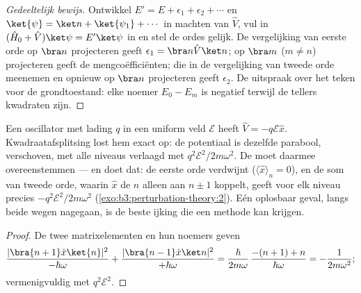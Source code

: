 \begin{proof}[Gedeeltelijk bewijs]
Ontwikkel $E' = E + \epsilon_1 + \epsilon_2 + \cdots$ en $\ket{\psi} =
\ket n + \ket{\psi_1} + \cdots$ in machten van $\hat V$, vul in
$(\hat H_0 + \hat V)\ket\psi = E'\ket\psi$ in en stel de ordes gelijk.
De vergelijking van eerste orde op $\bra n$ projecteren geeft $\epsilon_1 =
\bra n\hat V\ket n$; op $\bra m$ ($m \neq n$) projecteren geeft de
mengcoëfficiënten; die in de vergelijking van tweede orde meenemen en
opnieuw op $\bra n$ projecteren geeft $\epsilon_2$. De uitspraak over het
teken voor de grondtoestand: elke noemer $E_0 - E_m$ is negatief terwijl
de tellers kwadraten zijn.
\end{proof}

\begin{proposition}\label{prop:b3:perturbation-theory:oscillator-field}
Een oscillator met lading $q$ in een uniform veld $\mathcal E$ heeft
$\hat V = -q\mathcal E\hat x$. Kwadraatafsplitsing lost hem exact op: de
potentiaal is dezelfde parabool, verschoven, met alle niveaus verlaagd met
$q^2\mathcal E^2/2m\omega^2$. De  moet daarmee
overeenstemmen --- en doet dat: de eerste orde verdwijnt ($\langle\hat
x\rangle_n = 0$), en de som van tweede orde, waarin $\hat x$ de $n$ alleen
aan $n \pm 1$ koppelt, geeft voor elk niveau precies
$-q^2\mathcal E^2/2m\omega^2$
(\cref{exo:b3:perturbation-theory:2}). Eén oplosbaar geval, langs beide
wegen nagegaan, is de beste ijking die een methode kan krijgen.
\end{proposition}

\begin{proof}
De twee matrixelementen en hun noemers geven
\[
\frac{|\bra{n+1}\hat x\ket{n}|^2}{-\hbar\omega}
 + \frac{|\bra{n-1}\hat x\ket n|^2}{+\hbar\omega}
 = \frac{\hbar}{2m\omega}\,\frac{-(n+1) + n}{\hbar\omega}
 = -\frac{1}{2m\omega^2} ;
\]
vermenigvuldig met $q^2\mathcal E^2$.
\end{proof}

